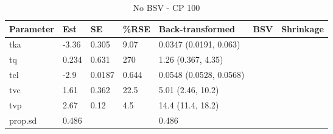 \begin{table}
\centering\centering
\caption{No BSV - CP 100}
\centering
\fontsize{8}{10}\selectfont
\begin{tabular}[t]{lllllll}
\toprule
\textbf{Parameter} & \textbf{Est} & \textbf{SE} & \textbf{\%RSE} & \textbf{Back-transformed} & \textbf{BSV} & \textbf{Shrinkage}\\
\midrule
tka & -3.36 & 0.305 & 9.07 & 0.0347 (0.0191, 0.063) &  & \\
\midrule
tq & 0.234 & 0.631 & 270 & 1.26 (0.367, 4.35) &  & \\
\midrule
tcl & -2.9 & 0.0187 & 0.644 & 0.0548 (0.0528, 0.0568) &  & \\
\midrule
tvc & 1.61 & 0.362 & 22.5 & 5.01 (2.46, 10.2) &  & \\
\midrule
tvp & 2.67 & 0.12 & 4.5 & 14.4 (11.4, 18.2) &  & \\
\midrule
prop.sd & 0.486 &  &  & 0.486 &  & \\
\bottomrule
\end{tabular}
\end{table}